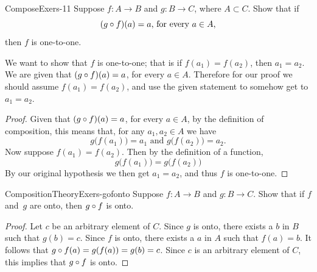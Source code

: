 \begin{example}{ComposeExers-11}
Suppose $f\colon A \to B$ and $g \colon B \to C$, where $A \subset C$. Show that if 
$$\mbox{$(g \circ f)(a) = a$, for every $a \in A$,} $$
 then $f$ is one-to-one.
 
 \begin{scratchwork}
 We want to show that $f$ is one-to-one; that is if $f(a_1) = f(a_2)$, then $a_1 = a_2$.  We are given that $(g \circ f)(a) = a$, for every $a \in A$.  Therefore for our proof we should assume $f(a_1) = f(a_2)$, and use the given statement to somehow get to $a_1 = a_2$. 
 \end{scratchwork}
 
 \begin{proof}
Given that $(g \circ f)(a) = a$, for every $a \in A$, by the definition of composition, this means
that, for any $a_1, a_2 \in A$ we have
$$ g \bigl( f(a_1) \bigr) = a_1 \mbox{ and }  g \bigl( f(a_2) \bigr) = a_2.$$
Now suppose $f(a_1) = f(a_2)$. Then by the definition of a function, 
$$ g \bigl( f(a_1) \bigr) =  g \bigl( f(a_2) \bigr)$$
By our original hypothesis we then get $a_1 = a_2$, and thus $f$ is one-to-one.
\end{proof}    
 \end{example}

\begin{example}{CompositionTheoryExers-gofonto} 
 Suppose $f \colon A \to B$ and $g \colon B \to C$. Show that if $f$ and~$g$ are onto, then $g \circ f$ is onto.

 \begin{proof}
Let $c$ be an arbitrary  element of $C$. Since $g$ is onto, there exists a $b$ in  $B$ such that $g(b) = c$.  Since $f$ is onto, there exists a $a$ in  $A$ such that $f(a) = b$. It follows that  $g \circ f(a) = g(f(a)) = g(b) = c$. Since $c$ is an arbitrary element of $C$, this implies that $g \circ f$ is onto.
\end{proof}    
 \end{example}


